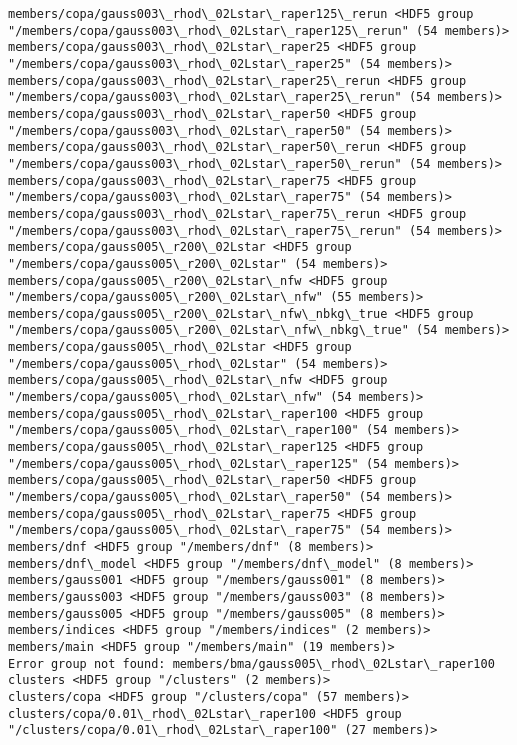 \documentclass[11pt]{article}
\begin{document}
\begin{Verbatim}[commandchars=\\\{\}]
members/copa/gauss003\_rhod\_02Lstar\_raper125\_rerun <HDF5 group "/members/copa/gauss003\_rhod\_02Lstar\_raper125\_rerun" (54 members)>
members/copa/gauss003\_rhod\_02Lstar\_raper25 <HDF5 group "/members/copa/gauss003\_rhod\_02Lstar\_raper25" (54 members)>
members/copa/gauss003\_rhod\_02Lstar\_raper25\_rerun <HDF5 group "/members/copa/gauss003\_rhod\_02Lstar\_raper25\_rerun" (54 members)>
members/copa/gauss003\_rhod\_02Lstar\_raper50 <HDF5 group "/members/copa/gauss003\_rhod\_02Lstar\_raper50" (54 members)>
members/copa/gauss003\_rhod\_02Lstar\_raper50\_rerun <HDF5 group "/members/copa/gauss003\_rhod\_02Lstar\_raper50\_rerun" (54 members)>
members/copa/gauss003\_rhod\_02Lstar\_raper75 <HDF5 group "/members/copa/gauss003\_rhod\_02Lstar\_raper75" (54 members)>
members/copa/gauss003\_rhod\_02Lstar\_raper75\_rerun <HDF5 group "/members/copa/gauss003\_rhod\_02Lstar\_raper75\_rerun" (54 members)>
members/copa/gauss005\_r200\_02Lstar <HDF5 group "/members/copa/gauss005\_r200\_02Lstar" (54 members)>
members/copa/gauss005\_r200\_02Lstar\_nfw <HDF5 group "/members/copa/gauss005\_r200\_02Lstar\_nfw" (55 members)>
members/copa/gauss005\_r200\_02Lstar\_nfw\_nbkg\_true <HDF5 group "/members/copa/gauss005\_r200\_02Lstar\_nfw\_nbkg\_true" (54 members)>
members/copa/gauss005\_rhod\_02Lstar <HDF5 group "/members/copa/gauss005\_rhod\_02Lstar" (54 members)>
members/copa/gauss005\_rhod\_02Lstar\_nfw <HDF5 group "/members/copa/gauss005\_rhod\_02Lstar\_nfw" (54 members)>
members/copa/gauss005\_rhod\_02Lstar\_raper100 <HDF5 group "/members/copa/gauss005\_rhod\_02Lstar\_raper100" (54 members)>
members/copa/gauss005\_rhod\_02Lstar\_raper125 <HDF5 group "/members/copa/gauss005\_rhod\_02Lstar\_raper125" (54 members)>
members/copa/gauss005\_rhod\_02Lstar\_raper50 <HDF5 group "/members/copa/gauss005\_rhod\_02Lstar\_raper50" (54 members)>
members/copa/gauss005\_rhod\_02Lstar\_raper75 <HDF5 group "/members/copa/gauss005\_rhod\_02Lstar\_raper75" (54 members)>
members/dnf <HDF5 group "/members/dnf" (8 members)>
members/dnf\_model <HDF5 group "/members/dnf\_model" (8 members)>
members/gauss001 <HDF5 group "/members/gauss001" (8 members)>
members/gauss003 <HDF5 group "/members/gauss003" (8 members)>
members/gauss005 <HDF5 group "/members/gauss005" (8 members)>
members/indices <HDF5 group "/members/indices" (2 members)>
members/main <HDF5 group "/members/main" (19 members)>
Error group not found: members/bma/gauss005\_rhod\_02Lstar\_raper100
clusters <HDF5 group "/clusters" (2 members)>
clusters/copa <HDF5 group "/clusters/copa" (57 members)>
clusters/copa/0.01\_rhod\_02Lstar\_raper100 <HDF5 group "/clusters/copa/0.01\_rhod\_02Lstar\_raper100" (27 members)>

\end{Verbatim}
\end{document}
